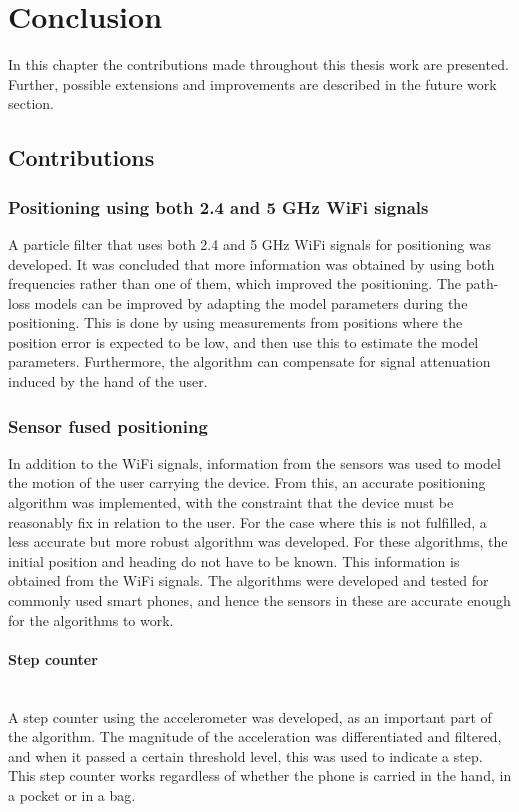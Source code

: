 \documentclass{LTHthesis}
\begin{document}
\chapter{Conclusion}
%
In this chapter the contributions made throughout this thesis work are presented. Further, possible extensions and improvements are described in the future work section.
%
\label{chap:conclusion}


\section{Contributions}

\subsection{Positioning using both 2.4 and 5 GHz WiFi signals}
A particle filter that uses both 2.4 and 5 GHz WiFi signals for positioning was developed. It was concluded that more information was obtained by using both frequencies rather than one of them, which improved the positioning. The path-loss models can be improved by adapting the model parameters during the positioning. This is done by using measurements from positions where the position error is expected to be low, and then use this to estimate the model parameters. Furthermore, the algorithm can compensate for signal attenuation induced by the hand of the user.



\subsection{Sensor fused positioning}
In addition to the WiFi signals, information from the sensors was used to model the motion of the user carrying the device. From this, an accurate positioning algorithm was implemented, with the constraint that the device must be reasonably fix in relation to the user. For the case where this is not fulfilled, a less accurate but more robust algorithm was developed. For these algorithms, the initial position and heading do not have to be known. This information is obtained from the WiFi signals. The algorithms were developed and tested for commonly used smart phones, and hence the sensors in these are accurate enough for the algorithms to work.


\subsubsection{Step counter} ~\\
A step counter using the accelerometer was developed, as an important part of the algorithm. The magnitude of the acceleration was differentiated and filtered, and when it passed a certain threshold level, this was used to indicate a step. This step counter works regardless of whether the phone is carried in the hand, in a pocket or in a bag. 
\end{document}
